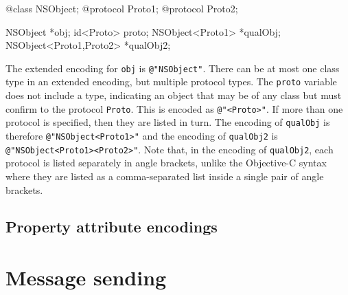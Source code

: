 \documentclass[a4paper]{report}
\newcommand{\objc}[1]{\lstinline[language={[Objective]C}]{#1}}
\begin{document}
\begin{codesnippet}
@class NSObject;
@protocol Proto1;
@protocol Proto2;

NSObject *obj;
id<Proto> proto;
NSObject<Proto1> *qualObj;
NSObject<Proto1,Proto2> *qualObj2;
\end{codesnippet}

The extended encoding for \objc{obj} is \texttt{@"NSObject"}.
There can be at most one class type in an extended encoding, but multiple protocol types.
The \objc{proto} variable does not include a type, indicating an object that may be of any class but must confirm to the protocol \objc{Proto}.
This is encoded as \texttt{@"<Proto>"}.
If more than one protocol is specified, then they are listed in turn.
The encoding of \objc{qualObj} is therefore \texttt{@"NSObject<Proto1>"} and the encoding of \objc{qualObj2} is \texttt{@"NSObject<Proto1><Proto2>"}.
Note that, in the encoding of \objc{qualObj2}, each protocol is listed separately in angle brackets, unlike the Objective-C syntax where they are listed as a comma-separated list inside a single pair of angle brackets.

\section{Property attribute encodings}



\chapter{Message sending}
\end{document}
